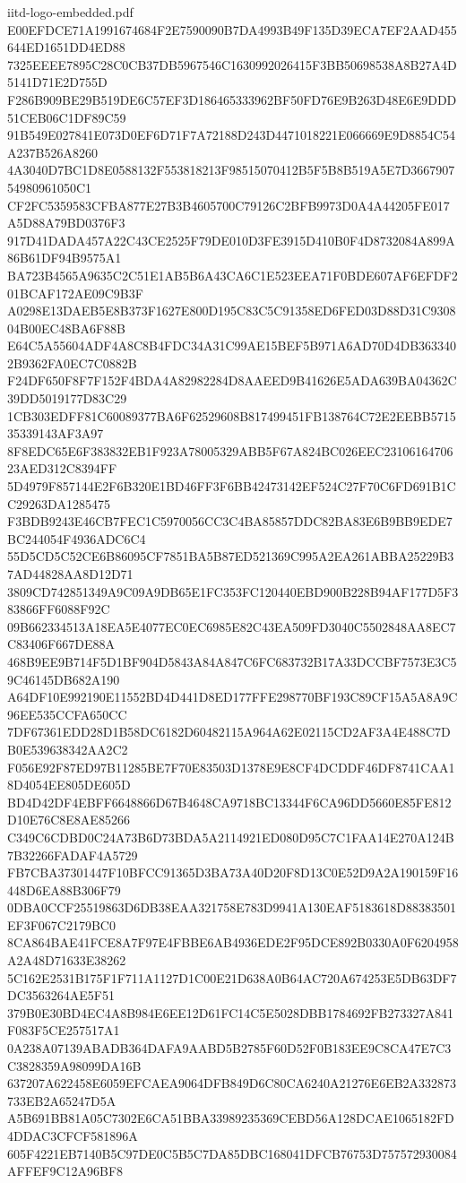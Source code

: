 \begin{filecontents*}[overwrite]{iitd-logo-embedded.pdf}
E00EFDCE71A1991674684F2E7590090B7DA4993B49F135D39ECA7EF2AAD455644ED1651DD4ED88
7325EEEE7895C28C0CB37DB5967546C1630992026415F3BB50698538A8B27A4D5141D71E2D755D
F286B909BE29B519DE6C57EF3D186465333962BF50FD76E9B263D48E6E9DDD51CEB06C1DF89C59
91B549E027841E073D0EF6D71F7A72188D243D4471018221E066669E9D8854C54A237B526A8260
4A3040D7BC1D8E0588132F553818213F98515070412B5F5B8B519A5E7D366790754980961050C1
CF2FC5359583CFBA877E27B3B4605700C79126C2BFB9973D0A4A44205FE017A5D88A79BD0376F3
917D41DADA457A22C43CE2525F79DE010D3FE3915D410B0F4D8732084A899A86B61DF94B9575A1
BA723B4565A9635C2C51E1AB5B6A43CA6C1E523EEA71F0BDE607AF6EFDF201BCAF172AE09C9B3F
A0298E13DAEB5E8B373F1627E800D195C83C5C91358ED6FED03D88D31C930804B00EC48BA6F88B
E64C5A55604ADF4A8C8B4FDC34A31C99AE15BEF5B971A6AD70D4DB3633402B9362FA0EC7C0882B
F24DF650F8F7F152F4BDA4A82982284D8AAEED9B41626E5ADA639BA04362C39DD5019177D83C29
1CB303EDFF81C60089377BA6F62529608B817499451FB138764C72E2EEBB571535339143AF3A97
8F8EDC65E6F383832EB1F923A78005329ABB5F67A824BC026EEC2310616470623AED312C8394FF
5D4979F857144E2F6B320E1BD46FF3F6BB42473142EF524C27F70C6FD691B1CC29263DA1285475
F3BDB9243E46CB7FEC1C5970056CC3C4BA85857DDC82BA83E6B9BB9EDE7BC244054F4936ADC6C4
55D5CD5C52CE6B86095CF7851BA5B87ED521369C995A2EA261ABBA25229B37AD44828AA8D12D71
3809CD742851349A9C09A9DB65E1FC353FC120440EBD900B228B94AF177D5F383866FF6088F92C
09B662334513A18EA5E4077EC0EC6985E82C43EA509FD3040C5502848AA8EC7C83406F667DE88A
468B9EE9B714F5D1BF904D5843A84A847C6FC683732B17A33DCCBF7573E3C59C46145DB682A190
A64DF10E992190E11552BD4D441D8ED177FFE298770BF193C89CF15A5A8A9C96EE535CCFA650CC
7DF67361EDD28D1B58DC6182D60482115A964A62E02115CD2AF3A4E488C7DB0E539638342AA2C2
F056E92F87ED97B11285BE7F70E83503D1378E9E8CF4DCDDF46DF8741CAA18D4054EE805DE605D
BD4D42DF4EBFF6648866D67B4648CA9718BC13344F6CA96DD5660E85FE812D10E76C8E8AE85266
C349C6CDBD0C24A73B6D73BDA5A2114921ED080D95C7C1FAA14E270A124B7B32266FADAF4A5729
FB7CBA37301447F10BFCC91365D3BA73A40D20F8D13C0E52D9A2A190159F16448D6EA88B306F79
0DBA0CCF25519863D6DB38EAA321758E783D9941A130EAF5183618D88383501EF3F067C2179BC0
8CA864BAE41FCE8A7F97E4FBBE6AB4936EDE2F95DCE892B0330A0F6204958A2A48D71633E38262
5C162E2531B175F1F711A1127D1C00E21D638A0B64AC720A674253E5DB63DF7DC3563264AE5F51
379B0E30BD4EC4A8B984E6EE12D61FC14C5E5028DBB1784692FB273327A841F083F5CE257517A1
0A238A07139ABADB364DAFA9AABD5B2785F60D52F0B183EE9C8CA47E7C3C3828359A98099DA16B
637207A622458E6059EFCAEA9064DFB849D6C80CA6240A21276E6EB2A332873733EB2A65247D5A
A5B691BB81A05C7302E6CA51BBA33989235369CEBD56A128DCAE1065182FD4DDAC3CFCF581896A
605F4221EB7140B5C97DE0C5B5C7DA85DBC168041DFCB76753D757572930084AFFEF9C12A96BF8

\end{filecontents*}
